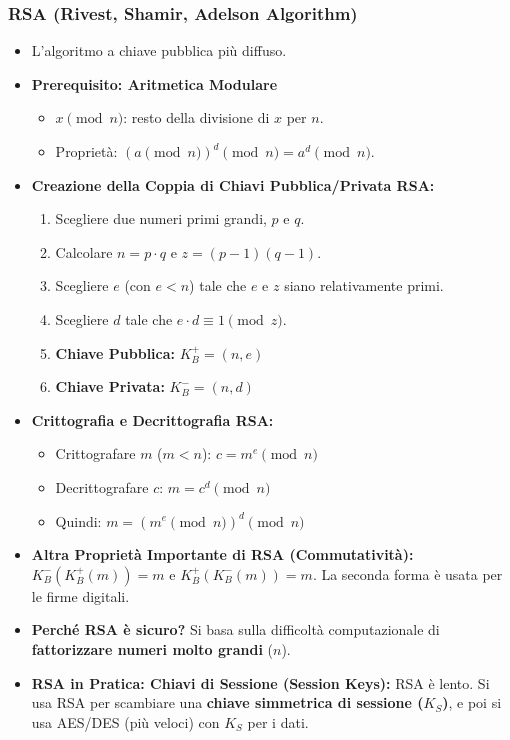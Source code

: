 \documentclass{article}
\begin{document}
\subsubsection{RSA (Rivest, Shamir, Adelson Algorithm)}
\begin{itemize}
    \item L'algoritmo a chiave pubblica più diffuso.
    \item \textbf{Prerequisito: Aritmetica Modulare}
    \begin{itemize}
        \item $x \pmod n$: resto della divisione di $x$ per $n$.
        \item Proprietà: $(a \pmod n)^d \pmod n = a^d \pmod n$.
    \end{itemize}
    \item \textbf{Creazione della Coppia di Chiavi Pubblica/Privata RSA:}
    \begin{enumerate}
        \item Scegliere due numeri primi grandi, $p$ e $q$.
        \item Calcolare $n = p \cdot q$ e $z = (p-1)(q-1)$.
        \item Scegliere $e$ (con $e<n$) tale che $e$ e $z$ siano relativamente primi.
        \item Scegliere $d$ tale che $e \cdot d \equiv 1 \pmod z$.
        \item \textbf{Chiave Pubblica:} $K_B^+ = (n, e)$
        \item \textbf{Chiave Privata:} $K_B^- = (n, d)$
    \end{enumerate}
    \item \textbf{Crittografia e Decrittografia RSA:}
    \begin{itemize}
        \item Crittografare $m$ ($m < n$): $c = m^e \pmod n$
        \item Decrittografare $c$: $m = c^d \pmod n$
        \item Quindi: $m = (m^e \pmod n)^d \pmod n$
    \end{itemize}
    \item \textbf{Altra Proprietà Importante di RSA (Commutatività):}
    $K_B^-(K_B^+(m)) = m$ e $K_B^+(K_B^-(m)) = m$. La seconda forma è usata per le firme digitali.
    \item \textbf{Perché RSA è sicuro?} Si basa sulla difficoltà computazionale di \textbf{fattorizzare numeri molto grandi} ($n$).
    \item \textbf{RSA in Pratica: Chiavi di Sessione (Session Keys):}
    RSA è lento. Si usa RSA per scambiare una \textbf{chiave simmetrica di sessione ($K_S$)}, e poi si usa AES/DES (più veloci) con $K_S$ per i dati.
\end{itemize}
\end{document}
